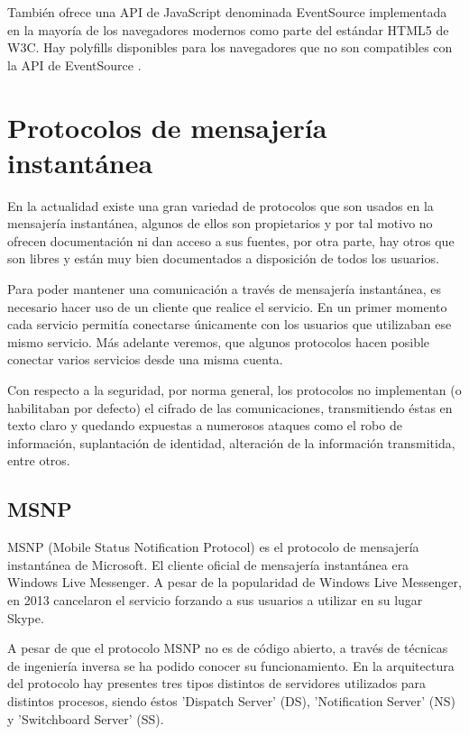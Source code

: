 También ofrece una API de JavaScript denominada EventSource implementada en la mayoría de los navegadores modernos como parte del estándar HTML5 de W3C. Hay polyfills disponibles para los navegadores que no son compatibles con la API de EventSource \cite{sse3}.

\section{Protocolos de mensajería instantánea}

En la actualidad existe una gran variedad de protocolos que son usados en la mensajería instantánea, algunos de ellos son propietarios y por tal motivo no ofrecen documentación ni dan acceso a sus fuentes, por otra parte, hay otros que son libres y están muy bien documentados a disposición de todos los usuarios.

Para poder mantener una comunicación a través de mensajería instantánea, es necesario hacer uso de un cliente que realice el servicio. En un primer momento cada servicio permitía conectarse únicamente con los usuarios que utilizaban ese mismo servicio. Más adelante veremos, que algunos protocolos hacen posible conectar varios servicios desde una misma cuenta.

Con respecto a la seguridad, por norma general, los protocolos no implementan (o habilitaban por defecto) el cifrado de las comunicaciones, transmitiendo éstas en texto claro y quedando expuestas a numerosos ataques como el robo de información, suplantación de identidad, alteración de la información transmitida, entre otros.

\subsection{MSNP}

MSNP (Mobile Status Notification Protocol) es el protocolo de mensajería instantánea de Microsoft. El cliente oficial de mensajería instantánea era Windows Live Messenger. A pesar de la popularidad de Windows Live Messenger, en 2013 cancelaron el servicio forzando a sus usuarios a utilizar en su lugar Skype.

A pesar de que el protocolo MSNP no es de código abierto, a través de técnicas de ingeniería inversa se ha podido conocer su funcionamiento. En la arquitectura del protocolo hay presentes tres tipos distintos de servidores utilizados para distintos procesos, siendo éstos 'Dispatch Server' (DS), 'Notification Server' (NS) y 'Switchboard Server' (SS).

